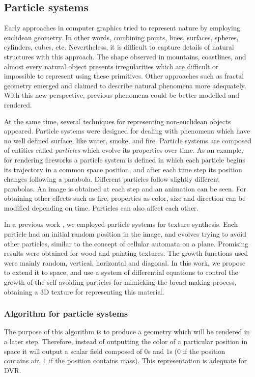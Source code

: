 \documentclass[oneside,a4paper,english,links]{amca}
\begin{document}
\subsection{Particle systems}

Early approaches in computer graphics tried to represent nature by employing euclidean geometry. In other words, combining points, lines, surfaces, spheres, cylinders, cubes, etc. Nevertheless, it is difficult to capture details of natural structures with this approach. The shape observed in mountains, coastlines,  and almost every natural object presents irregularities which are difficult or impossible to represent using these primitives. Other approaches such as fractal geometry \citep{Mandelbrot83} emerged and claimed to describe natural phenomena more adequately. With this new perspective, previous phenomena could be better modelled and rendered. 

At the same time, several techniques for representing non-euclidean
objects appeared. Particle systems \citep{Reeves83} were designed for
dealing with phenomena which have no well defined surface, like water,
smoke, and fire. Particle systems are composed of entities called {\em
  particles} which evolve its properties over time. As an example, for
rendering fireworks a particle system is defined in which each
particle begins its trajectory in a common space position, and after
each time step its position changes following a parabola. Different
particles follow slightly different parabolas. An image is obtained at
each step and an animation can be seen. For obtaining other effects
such as fire, properties as color, size and direction can be modified
depending on time. Particles can also affect each other.

In a previous work \citep{Baravalle2011}, we employed particle systems for texture synthesis. Each particle had an initial random position in the image, and evolves trying to avoid other particles, similar to the concept of cellular automata on a plane. Promising results were obtained for wood and painting textures. The growth functions used were mainly random, vertical, horizontal and diagonal. In this work, we propose to extend it to space, and use a system of differential equations to control the growth of the self-avoiding particles for mimicking the bread making process, obtaining a 3D texture for representing this material. 

\subsubsection{Algorithm for particle systems}
The purpose of this algorithm is to produce a geometry which will be rendered in a later step. Therefore, instead of outputting the color of a particular position in space it will output a scalar field composed of $0$s and $1$s ($0$ if the position contains air, $1$ if the position contains mass). This representation is adequate for DVR.
\end{document}
